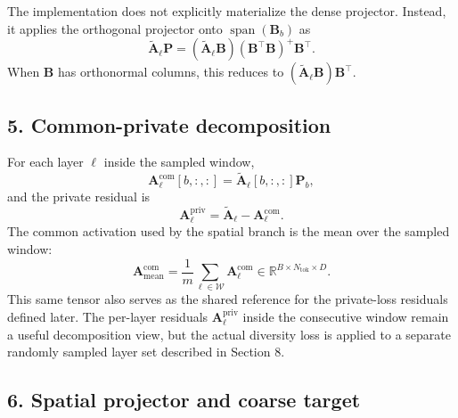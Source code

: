 \documentclass[11pt]{article}
\begin{document}
The implementation does not explicitly materialize the dense projector. Instead, it applies the
orthogonal projector onto $\operatorname{span}(\bm{B}_b)$ as
\[
  \tilde{\bm{A}}_\ell \bm{P}
  =
  (\tilde{\bm{A}}_\ell \bm{B})
  (\bm{B}^\top \bm{B})^{+}
  \bm{B}^\top.
\]
When $\bm{B}$ has orthonormal columns, this reduces to $(\tilde{\bm{A}}_\ell \bm{B})\bm{B}^\top$.

\subsection*{5. Common-private decomposition}
For each layer $\ell$ inside the sampled window,
\[
  \bm{A}^{\mathrm{com}}_\ell[b,:,:]
  =
  \tilde{\bm{A}}_\ell[b,:,:]\bm{P}_b,
\]
and the private residual is
\[
  \bm{A}^{\mathrm{priv}}_\ell
  =
  \tilde{\bm{A}}_\ell - \bm{A}^{\mathrm{com}}_\ell.
\]
The common activation used by the spatial branch is the mean over the sampled window:
\[
  \bm{A}^{\mathrm{com}}_{\mathrm{mean}}
  =
  \frac{1}{m}\sum_{\ell\in\mathcal{W}} \bm{A}^{\mathrm{com}}_\ell
  \in
  \mathbb{R}^{B\times N_{\mathrm{tok}}\times D}.
\]
This same tensor also serves as the shared reference for the private-loss residuals defined later.
The per-layer residuals $\bm{A}^{\mathrm{priv}}_\ell$ inside the consecutive window remain a useful decomposition view, but the actual diversity loss is applied to a separate randomly sampled layer set described in Section 8.

\subsection*{6. Spatial projector and coarse target}
\end{document}
